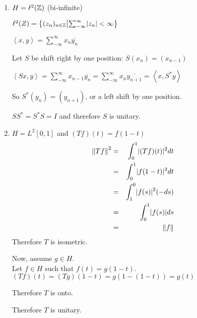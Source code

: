 \documentclass[letterpaper,12pt,fleqn]{article}
\newcommand{\norm}[1]{\left\|#1\right\|}
\newcommand{\inner}[1]{\left<#1\right>}
\newcommand{\conj}[1]{\overline{#1}}
\begin{document}
\begin{examples}
  \listbreak
  \begin{enumerate}
  \item $H=\ell^2(\mathbb{Z})$ (bi-infinite)

    $\ell^2(Z)=\left\{(z_n)_{n\in\mathbb{Z}}\middle|\sum_{-\infty}^{\infty}\lvert z_n\rvert<\infty
    \right\}$

    $\inner{x,y}=\sum_{-\infty}^{\infty}x_n\conj{y_n}$

    Let $S$ be shift right by one position: $S(x_n)=(x_{n-1})$

    $\inner{Sx,y}=\sum_{-\infty}^{\infty}x_{n-1}\conj{y_n}=
    \sum_{-\infty}^{\infty}x_n\conj{y_{n+1}}=\inner{x,S^*y}$

    So $S^*(y_n)=(y_{n+1})$, or a left shift by one position.

    $SS^*=S^*S=I$ and therefore $S$ is unitary.

  \item $H=L^2[0,1]$ and $(Tf)(t)=f(1-t)$
    \begin{eqnarray*}
      \norm{Tf}^2 &=& \int_0^1\abs{(Tf)(t)}^2dt \\
      &=& \int_0^1\abs{f(1-t)}^2dt \\
      &=& \int_1^0\abs{f(s)}^2(-ds) \\
      &=& \int_0^1\abs{f(s)}ds \\
      &=& \norm{f}
    \end{eqnarray*}
    Therefore $T$ is isometric.

    Now, assume $g\in H$. \\
    Let $f\in H$ such that $f(t)=g(1-t)$. \\
    $(Tf)(t)=(Tg)(1-t)=g(1-(1-t))=g(t)$

    Therefore $T$ is onto.

    Therefore $T$ is unitary.
  \end{enumerate}
\end{examples}
\end{document}
